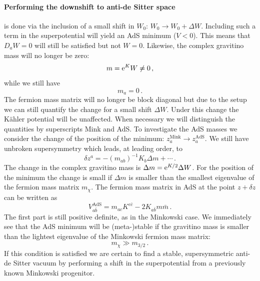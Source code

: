 \documentclass[12pt]{report}
\newcommand{\be}{\begin{equation}}
\newcommand{\ee}{\end{equation}}
\def\rme{{\rm e}}
\begin{document}
\paragraph{Performing the downshift to anti-de Sitter space} is done via the inclusion of a small shift in $W_0$: $W_0 \to W_0 +\Delta W$. Including such a term in the superpotential will yield an AdS minimum ($V<0$). This means that $D_aW=0$ will still be satisfied but not $W=0$. Likewise, the complex gravitino mass will no longer be zero:
\be 
m = \rme^K W \neq 0\,,
\ee 
while we still have 
\be 
m_a = 0\,.
\ee
The fermion mass matrix will no longer be block diagonal but due to the setup we can still quantify the change for a small shift $\Delta W$. Under this change the Kähler potential will be unaffected. When necessary we will distinguish the quantities by superscripts Mink and AdS. To investigate the AdS masses we consider the change of the position of the minimum: $z_a^{\text{Mink}} \to z_a^{\text{AdS}}$. We still have unbroken supersymmetry which leads, at leading order, to
\be 
\delta z^a = - (m_{ab})^{-1} K_b \Delta m + \cdots\,.
\ee
The change in the complex gravitino mass is $\Delta m = \rme^{K/2} \Delta W$. For the position of the minimum the change is small if $\Delta m$ is smaller than the smallest eigenvalue of the fermion mass matrix $m_\chi$. The fermion mass matrix in AdS at the point $z + \delta z$ can be written as
\be 
V_{a\bar{b}}^{\text{AdS}}=m_{ac}K^{c\bar{c}}-2K_{a\bar{b}} m \bar{m}\,.
\ee
The first part is still positive definite, as in the Minkowski case. We immediately see that the AdS minimum will be (meta-)stable if the gravitino mass is smaller than the lightest eigenvalue of the Minkowski fermion mass matrix:
\be 
m_{\chi} \gg m_{3/2}\,.
\ee
If this condition is satisfied we are certain to find a stable, supersymmetric anti-de Sitter vacuum by performing a shift in the superpotential from a previously known Minkowski progenitor.
\end{document}
